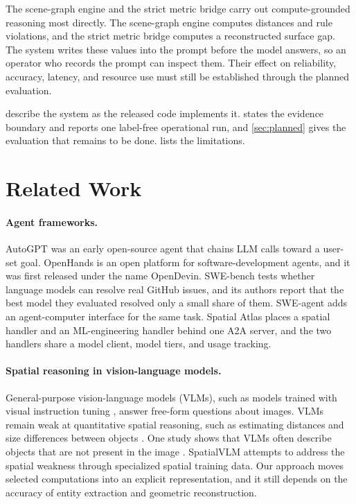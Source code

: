\documentclass{article}
\begin{document}
The scene-graph engine and the strict metric bridge carry out compute-grounded reasoning most directly. The scene-graph engine computes distances and rule violations, and the strict metric bridge computes a reconstructed surface gap. The system writes these values into the prompt before the model answers, so an operator who records the prompt can inspect them. Their effect on reliability, accuracy, latency, and resource use must still be established through the planned evaluation.

 describe the system as the released code implements it.  states the evidence boundary and reports one label-free operational run, and \cref{sec:planned} gives the evaluation that remains to be done.  lists the limitations.

\section{Related Work}
\label{sec:related}

\paragraph{Agent frameworks.}
AutoGPT \citep{autogpt2023} was an early open-source agent that chains LLM calls toward a user-set goal. OpenHands \citep{wangOpenHands} is an open platform for software-development agents, and it was first released under the name OpenDevin. SWE-bench \citep{jimenez2024swebench} tests whether language models can resolve real GitHub issues, and its authors report that the best model they evaluated resolved only a small share of them. SWE-agent \citep{yang2024sweagent} adds an agent-computer interface for the same task. Spatial Atlas places a spatial handler and an ML-engineering handler behind one A2A server, and the two handlers share a model client, model tiers, and usage tracking.

\paragraph{Spatial reasoning in vision-language models.}
General-purpose vision-language models (VLMs), such as models trained with visual instruction tuning \citep{liu2024llava}, answer free-form questions about images. VLMs remain weak at quantitative spatial reasoning, such as estimating distances and size differences between objects \citep{chen2024spatialvlm, liao2024qspatial, cho2026spatialclaw}. One study shows that VLMs often describe objects that are not present in the image \citep{li2023evaluating}. SpatialVLM \citep{chen2024spatialvlm} attempts to address the spatial weakness through specialized spatial training data. Our approach moves selected computations into an explicit representation, and it still depends on the accuracy of entity extraction and geometric reconstruction.
\end{document}
